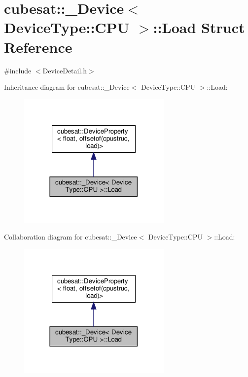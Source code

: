 \hypertarget{structcubesat_1_1__Device_3_01DeviceType_1_1CPU_01_4_1_1Load}{}\section{cubesat\+:\+:\+\_\+\+Device$<$ Device\+Type\+:\+:C\+PU $>$\+:\+:Load Struct Reference}
\label{structcubesat_1_1__Device_3_01DeviceType_1_1CPU_01_4_1_1Load}


{\ttfamily \#include $<$Device\+Detail.\+h$>$}



Inheritance diagram for cubesat\+:\+:\+\_\+\+Device$<$ Device\+Type\+:\+:C\+PU $>$\+:\+:Load\+:\nopagebreak
\begin{figure}[H]
\begin{center}
\leavevmode
\includegraphics[width=213pt]{structcubesat_1_1__Device_3_01DeviceType_1_1CPU_01_4_1_1Load__inherit__graph}
\end{center}
\end{figure}


Collaboration diagram for cubesat\+:\+:\+\_\+\+Device$<$ Device\+Type\+:\+:C\+PU $>$\+:\+:Load\+:\nopagebreak
\begin{figure}[H]
\begin{center}
\leavevmode
\includegraphics[width=213pt]{structcubesat_1_1__Device_3_01DeviceType_1_1CPU_01_4_1_1Load__coll__graph}
\end{center}
\end{figure}
